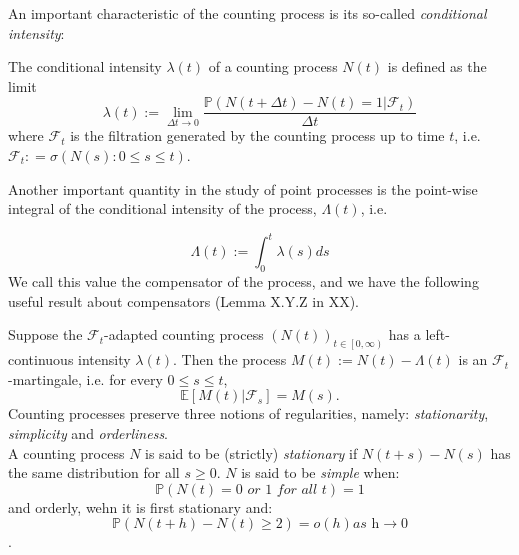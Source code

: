 \documentclass[12pt,a4paper]{cau_thesis}
\begin{document}
An important characteristic of the counting process is its so-called
\emph{conditional intensity}:

\begin{definition}\label{def:conditional_intensity}
    The conditional intensity $\lambda(t)$ of a counting process $N(t)$ is defined as the limit
    \begin{equation}\label{eq:conditional_intensity}
        \lambda(t) := \lim_{\Delta t \to 0} \frac{\mathbb{P}(N(t+\Delta t)-N(t)=1|\mathcal{F}_t)}{\Delta t}
    \end{equation}
    where $\mathcal{F}_t$ is the filtration generated by the counting process up to time $t$,
    i.e. $\mathcal{F}_t : = \sigma(N(s): 0 \leq s \leq t)$.
\end{definition}

Another important quantity in the study of point processes is the
point-wise integral of the conditional intensity of the process,
$\Lambda(t)$, i.e.
\begin{definition}[Compensator]\label{def:compensator}
    \begin{equation}\label{eq:compensator}
        \Lambda(t) := \int_0^t \lambda(s) ds
    \end{equation}
    We call this value the compensator of the process, and we have the
    following useful result about compensators (Lemma X.Y.Z in XX).
\end{definition}
\begin{theorem}\label{thm:f_martingale}
    Suppose the $\mathcal{F}_t$-adapted counting process $(N(t))_{t \in \left[0, \infty \right)}$ has a left-continuous
    intensity $\lambda(t)$. Then the process $M(t) := N(t) - \Lambda(t)$
    is an $\mathcal{F}_t$-martingale, i.e. for every $0 \leq s \leq t$,
    \begin{equation}\label{eq:f_martingale}
        \mathbb{E}[M(t) | \mathcal{F}_s] = M(s).
    \end{equation}
    Counting processes preserve three notions of regularities, namely:
    \emph{stationarity}, \emph{simplicity} and \emph{orderliness}.\\
    A counting process $N$ is said to be (strictly) \emph{stationary} if $N(t + s) - N(s)$
    has the same distribution for all $s \geq 0$. $N$ is said to be \emph{simple} when:
    \begin{equation}
        \mathbb{P}(N({t}) = \textit{0 or 1 for all t}) = 1
    \end{equation}
    and orderly, wehn it is first stationary and:
    \begin{equation}
        \mathbb{P}(N(t+h) - N(t) \geq 2) = o(h) \textit{as h} \rightarrow 0
    \end{equation}.
\end{theorem}
\end{document}
